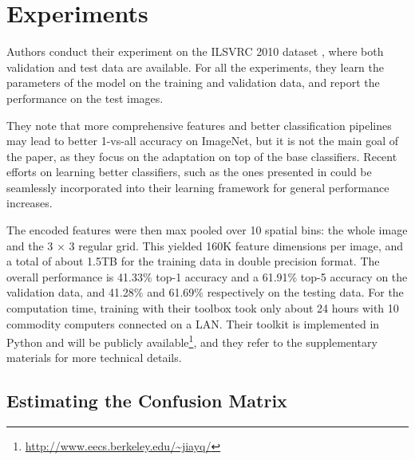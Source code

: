 \documentclass[10pt,twocolumn,letterpaper]{article}
\begin{document}
\section{Experiments}

Authors conduct their experiment on the ILSVRC 2010 dataset \cite{Fei}, where both validation and test data are available. For all the experiments, they learn the parameters of the model on the training and validation data, and report the performance on the test images.

They note that more comprehensive features and better classification pipelines may lead to better 1-vs-all accuracy on ImageNet, but it is not the main goal of the paper, as they focus on the adaptation on top of the base classifiers. Recent efforts on learning better classifiers, such as the ones presented in \cite{High,ImageNet} could be seamlessly incorporated into their learning framework for general performance increases.

The encoded features were then max pooled over 10 spatial bins: the whole image and the 3 $\times$ 3 regular grid. This yielded 160K feature dimensions per image, and a total of about 1.5TB for the training data in double precision format. The overall performance is 41.33\% top-1 accuracy and a 61.91\% top-5 accuracy on the validation data, and 41.28\% and 61.69\% respectively on the testing data. For the computation time, training with their toolbox took only about 24 hours with 10 commodity computers connected on a LAN. Their toolkit is implemented in Python and will be publicly available\footnote{\url{http://www.eecs.berkeley.edu/~jiayq/}}, and they refer to the supplementary materials for more technical details.
\balance
\subsection{Estimating the Confusion Matrix}
\end{document}
